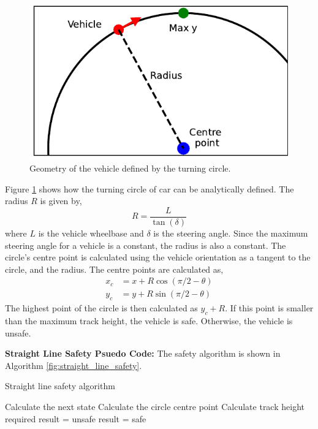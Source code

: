 \documentclass[letterpaper, 10 pt, conference]{ieeeconf}  %
\begin{document}
\begin{figure}
    \centering
    \includegraphics[width=0.8\linewidth]{Imgs/CircleGeometry.pdf}
    \caption{Geometry of the vehicle defined by the turning circle.}
    \label{fig:CircleGeometry}
\end{figure}

Figure \ref{fig:CircleGeometry} shows how the turning circle of car can be analytically defined.
The radius $R$ is given by, 
\begin{equation}
    R = \frac{L}{\tan(\delta)}
\end{equation}
where $L$ is the vehicle wheelbase and $\delta$ is the steering angle.
Since the maximum steering angle for a vehicle is a constant, the radius is also a constant. 
The circle's centre point is calculated using the vehicle orientation as a tangent to the circle, and the radius.
The centre points are calculated as,
\begin{align}
    x_c & = x + R \cos(\pi/2 - \theta) \\
    y_c & = y + R \sin(\pi/2 - \theta) 
\end{align}
The highest point of the circle is then calculated as $y_c + R$.
If this point is smaller than the maximum track height, the vehicle is safe.
Otherwise, the vehicle is unsafe.

\textbf{Straight Line Safety Psuedo Code:}
The safety algorithm is shown in Algorithm \ref{fig:straight_line_safety}.

\begin{algorithm}
    \caption{Straight line safety algorithm} \label{alg:straight_safety}
    \begin{algorithmic}[1]
        \State Calculate the next state 
        \State Calculate the circle centre point
        \State Calculate track height required 
            \State result = unsafe
        \Else 
            \State result = safe
        \EndIf
    \end{algorithmic}
\end{algorithm}
\end{document}
